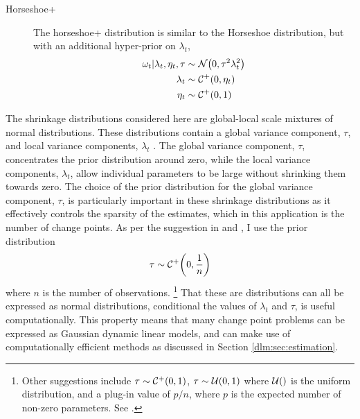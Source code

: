 \begin{description}
\item[Horseshoe+] The horseshoe+ distribution \textcite{BhadraDattaPolsonEtAl2015a} is similar to the Horseshoe distribution, but with an additional hyper-prior on $\lambda_{t}$,
\begin{equation}
  \label{dlm:eq:15}
  \begin{aligned}[t]
    \omega_{t} | \lambda_{t}, \eta_{t}, \tau & \sim \mathcal{N}\mathopen{}\left(0, \tau^{2} \lambda_{t}^{2}\right)\mathclose{} \\
    \lambda_{t}  & \sim \mathcal{C^+}\mathopen{}\left(0, \eta_{t}\right)\mathclose{} \\
    \eta_{t} & \sim \mathcal{C^+}\mathopen{}\left(0, 1\right)\mathclose{} \\
  \end{aligned}
\end{equation}
\end{description}

The shrinkage distributions considered here are global-local scale mixtures of normal distributions.
These distributions contain a global variance component, $\tau$, and local variance components, $\lambda_{t}$ \parencite{PolsonScott2010}.
The global variance component, $\tau$, concentrates the prior distribution around zero, while the local variance components, $\lambda_{t}$, allow individual parameters to be large without shrinking them towards zero.
The choice of the prior distribution for the global variance component, $\tau$, is particularly important in these shrinkage distributions as it effectively controls the sparsity of the estimates, which in this application is the number of change points.
As per the suggestion in \textcite{BhadraDattaPolsonEtAl2015a} and \textcite{PasKleijnVaart2014a}, I use the prior distribution
\begin{equation}
  \tau \sim \mathcal{C^+}\mathopen{}\left(0, \frac{1}{n}\right)\mathclose{}
\end{equation}
where $n$ is the number of observations.
\footnote{
  Other suggestions include $\tau \sim \mathcal{C^+}\mathopen{}\left(0, 1\right)\mathclose{}$, $\tau \sim \mathcal{U}\mathopen{}\left(0, 1\right)\mathclose{}$ where $\mathcal{U}\mathopen{}\left(\right)\mathclose{}$ is the uniform distribution, and a plug-in value of $p / n$, where $p$ is the expected number of non-zero parameters. See \textcites{PolsonScott2012}{PasKleijnVaart2014a}{BhadraDattaPolsonEtAl2015a}.
}
That these are distributions can all be expressed as normal distributions, conditional the values of $\lambda_{t}$ and $\tau$, is useful computationally.
This property means that many change point problems can be expressed as Gaussian dynamic linear models, and can make use of computationally efficient methods as discussed in Section \ref{dlm:sec:estimation}.

